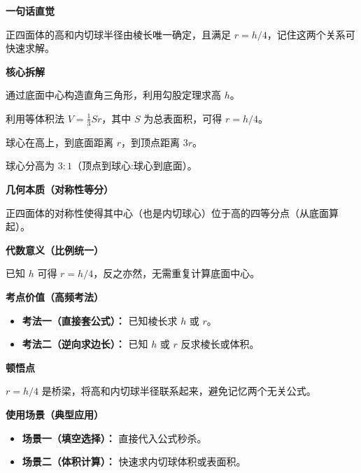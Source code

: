 \begin{explanationbox}
	\textbf{\textcolor{CExplanation}{一句话直觉}}

	正四面体的高和内切球半径由棱长唯一确定，且满足 $r = h/4$，记住这两个关系可快速求解。

	\medskip
	\textbf{\textcolor{CExplanation}{核心拆解}}
	\begin{description}[style=nextline, leftmargin=2.8em, labelsep=0.5em, itemsep=0.45em]
		\item[\textbf{要点一（高线计算）：}] 通过底面中心构造直角三角形，利用勾股定理求高 $h$。
		\item[\textbf{要点二（体积法求半径）：}] 利用等体积法 $V = \frac{1}{3}S r$，其中 $S$ 为总表面积，可得 $r = h/4$。
		\item[\textbf{要点三（球心定位）：}] 球心在高上，到底面距离 $r$，到顶点距离 $3r$。
		\item[\textbf{要点四（比例关系）：}] 球心分高为 $3:1$（顶点到球心:球心到底面）。
	\end{description}

	\medskip
	\textbf{\textcolor{CExplanation}{几何本质（对称性等分）}}

	正四面体的对称性使得其中心（也是内切球心）位于高的四等分点（从底面算起）。

	\medskip
	\textbf{\textcolor{CExplanation}{代数意义（比例统一）}}

	已知 $h$ 可得 $r = h/4$，反之亦然，无需重复计算底面中心。

	\medskip
	\textbf{\textcolor{CExplanation}{考点价值（高频考法）}}
	\begin{itemize}[leftmargin=*, itemsep=0.5em, topsep=0.4em]
		\item \textbf{考法一（直接套公式）：} 已知棱长求 $h$ 或 $r$。
		\item \textbf{考法二（逆向求边长）：} 已知 $h$ 或 $r$ 反求棱长或体积。
	\end{itemize}

	\medskip
	\textbf{\textcolor{CExplanation}{顿悟点}}

	$r = h/4$ 是桥梁，将高和内切球半径联系起来，避免记忆两个无关公式。

	\medskip
	\textbf{\textcolor{CExplanation}{使用场景（典型应用）}}
	\begin{itemize}[leftmargin=*, itemsep=0.5em, topsep=0.4em]
		\item \textbf{场景一（填空选择）：} 直接代入公式秒杀。
		\item \textbf{场景二（体积计算）：} 快速求内切球体积或表面积。
	\end{itemize}
\end{explanationbox}
